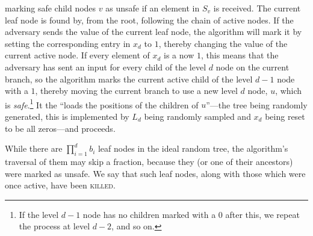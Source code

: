 \begin{itemize}
\begin{itemize}
marking safe child nodes $v$ as unsafe if an element in $S_v$ is received. The
current leaf node is found by, from the root, following the chain of active
nodes. If the adversary sends the value of the current leaf node, the
algorithm will mark it by setting the corresponding entry in $x_d$ to $1$,
thereby changing the value of the current active node. If every element of
$x_d$ is a now $1$, this means that the adversary has sent an input for every
child of the level $d$ node on the current branch, so the algorithm marks the
current active child of the level $d - 1$ node with a $1$, thereby moving the
current branch to use a new level $d$ node, $u$, which is
\emph{safe}.\footnote{If the level $d - 1$ node has no children marked with a
$0$ after this, we repeat the process at level $d -2$, and so on.} It the
``loads the positions of the children of $u$''---the tree being randomly
generated, this is implemented by $L_d$ being randomly sampled and $x_d$ being
reset to be all zeros---and proceeds.

While there are $\prod_{i=1}^{d} b_i$ leaf nodes in the ideal random tree, the algorithm's traversal of them may skip a fraction, because they (or one of their ancestors) were marked as unsafe. We say that such leaf nodes, along with those which were once active, have been \textsc{killed}.


\end{itemize}
\end{itemize}

